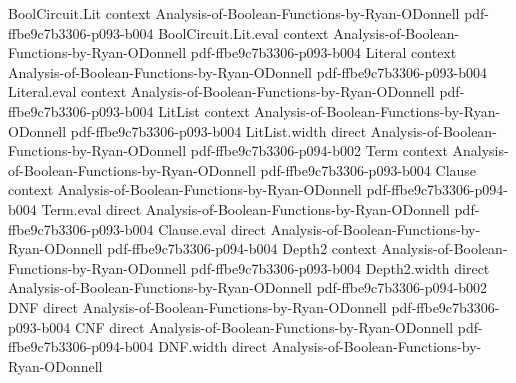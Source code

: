 \begin{theorem}
\leanok
{}
\proofstep
  {BoolCircuit.Lit}
  {context}
  {Analysis-of-Boolean-Functions-by-Ryan-ODonnell}
  {pdf-ffbe9c7b3306-p093-b004}
\proofstep
  {BoolCircuit.Lit.eval}
  {context}
  {Analysis-of-Boolean-Functions-by-Ryan-ODonnell}
  {pdf-ffbe9c7b3306-p093-b004}
\proofstep
  {Literal}
  {context}
  {Analysis-of-Boolean-Functions-by-Ryan-ODonnell}
  {pdf-ffbe9c7b3306-p093-b004}
\proofstep
  {Literal.eval}
  {context}
  {Analysis-of-Boolean-Functions-by-Ryan-ODonnell}
  {pdf-ffbe9c7b3306-p093-b004}
\proofstep
  {LitList}
  {context}
  {Analysis-of-Boolean-Functions-by-Ryan-ODonnell}
  {pdf-ffbe9c7b3306-p093-b004}
\proofstep
  {LitList.width}
  {direct}
  {Analysis-of-Boolean-Functions-by-Ryan-ODonnell}
  {pdf-ffbe9c7b3306-p094-b002}
\proofstep
  {Term}
  {context}
  {Analysis-of-Boolean-Functions-by-Ryan-ODonnell}
  {pdf-ffbe9c7b3306-p093-b004}
\proofstep
  {Clause}
  {context}
  {Analysis-of-Boolean-Functions-by-Ryan-ODonnell}
  {pdf-ffbe9c7b3306-p094-b004}
\proofstep
  {Term.eval}
  {direct}
  {Analysis-of-Boolean-Functions-by-Ryan-ODonnell}
  {pdf-ffbe9c7b3306-p093-b004}
\proofstep
  {Clause.eval}
  {direct}
  {Analysis-of-Boolean-Functions-by-Ryan-ODonnell}
  {pdf-ffbe9c7b3306-p094-b004}
\proofstep
  {Depth2}
  {context}
  {Analysis-of-Boolean-Functions-by-Ryan-ODonnell}
  {pdf-ffbe9c7b3306-p093-b004}
\proofstep
  {Depth2.width}
  {direct}
  {Analysis-of-Boolean-Functions-by-Ryan-ODonnell}
  {pdf-ffbe9c7b3306-p094-b002}
\proofstep
  {DNF}
  {direct}
  {Analysis-of-Boolean-Functions-by-Ryan-ODonnell}
  {pdf-ffbe9c7b3306-p093-b004}
\proofstep
  {CNF}
  {direct}
  {Analysis-of-Boolean-Functions-by-Ryan-ODonnell}
  {pdf-ffbe9c7b3306-p094-b004}
\proofstep
  {DNF.width}
  {direct}
  {Analysis-of-Boolean-Functions-by-Ryan-ODonnell}

\end{theorem}
